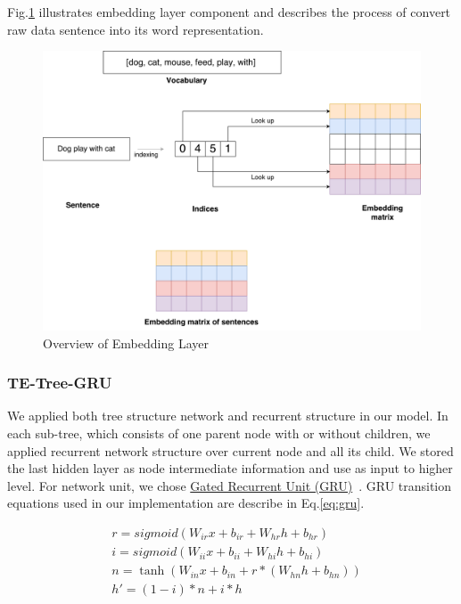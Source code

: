Fig.\ref{fig:embeddinglayer} illustrates embedding layer component and describes the process of convert raw data sentence into its word representation.

\begin{figure}[H]
    \centering
    \includegraphics[width=0.9\linewidth]{figure/embeddinglayer.pdf}
    \caption[Overview of embedding layer]{Overview of Embedding Layer}
    \label{fig:embeddinglayer}
\end{figure}



\subsubsection{TE-Tree-GRU}
We applied both tree structure network and recurrent structure in our model.
In each sub-tree, which consists of one parent node with or without children, we applied recurrent network structure over current node and all its child.
We stored the last hidden layer as node intermediate information and use as input to higher level.
For network unit, we chose \hyperref[sec:GRU]{Gated Recurrent Unit (GRU)}~\cite{cho2014learning}.
GRU transition equations used in our implementation are describe in Eq.\ref{eq:gru}.

\begin{equation}
\label{eq:gru}
\begin{aligned}
&r = sigmoid(W_{ir} x + b_{ir} + W_{hr} h + b_{hr}) \\
&i = sigmoid(W_{ii} x + b_{ii} + W_{hi} h + b_{hi}) \\
&n = \tanh(W_{in} x + b_{in} + r * (W_{hn} h + b_{hn})) \\
&h' = (1 - i) * n + i * h\\
\end{aligned}
\end{equation}

